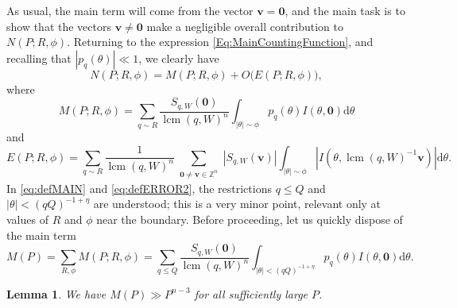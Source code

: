 \documentclass[a4paper,11pt, twoside,reqno]{amsart}
\theoremstyle{plain}
\newtheorem{lemma}[thm]{Lemma}
\theoremstyle{definition}
\theoremstyle{remark}
\newcommand{\ZZ}{\mathbb{Z}}
\newcommand{\dd}{\mathrm{d}}
\renewcommand{\le}{\leqslant}
\newcommand{\lcm}{\operatorname{lcm}}
\numberwithin{equation}{section}
\begin{document}
As usual, the main term will come from the vector $\bm{v}=\bm{0}$, 
and the main task is to show that the vectors $\bm{v}\neq \bm{0}$ make a negligible overall contribution to
$N(P;R,\phi)$. 
Returning to the expression 
\eqref{Eq:MainCountingFunction}, 
and recalling that $|p_q(\theta)|\ll 1$, 
we clearly have 
$$
N(P;R,\phi)=
M(P;R,\phi)+O\bigl(E(P;R,\phi)\bigr),
$$
where
\begin{equation}\label{eq:defMAIN}
M(P;R,\phi)=
\sum_{q\sim R}\frac{S_{q,W}(\bm{0})}{\lcm(q,W)^n}\int_{|\theta|\sim \phi}p_q(\theta)
I(\theta,\bm{0})\dd\theta
\end{equation}
and 
\begin{equation}\label{eq:defERROR2}
E(P;R,\phi)= \sum_{q\sim R} \frac{1}{\lcm(q,W)^n}
\sum_{
\substack{\bm{0}\ne \bm{v}\in \ZZ^n}} |S_{q,W}(\bm{v})|
\int_{|\theta|\sim
\phi } 
|I(\theta,\lcm(q,W)^{-1}\bm{v})|\dd\theta.
\end{equation}
In \eqref{eq:defMAIN} and \eqref{eq:defERROR2},
the restrictions $q\le Q$ and $|\theta|<(qQ)^{-1+\eta}$ are understood;
this is a very minor point,
relevant only at values of $R$ and $\phi$ near the boundary.
Before proceeding, let us quickly dispose of the main term
\begin{equation*}
M(P)
= \sum_{R,\phi} M(P;R,\phi)
= \sum_{q\le Q}\frac{S_{q,W}(\bm{0})}{\lcm(q,W)^n}
\int_{|\theta|<(qQ)^{-1+\eta}} p_q(\theta)
I(\theta,\bm{0})\dd\theta.
\end{equation*}

\begin{lemma}
\label{LEM:pos-main-term}
We have $M(P) \gg P^{n-3}$ for all sufficiently large $P$.
\end{lemma}
\end{document}
